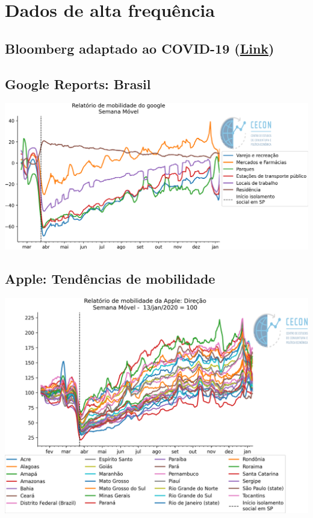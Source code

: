 \documentclass{SelfArx}
\begin{document}
\section*{Dados de alta frequência}
\label{sec:org96d814d}

\subsection*{Bloomberg adaptado ao COVID-19 (\href{https://www.bloomberg.com/news/articles/2020-11-13/alternative-data-show-activity-crashes-as-virus-resurges-chart}{Link})}
\label{sec:org97529b9}

\subsection*{Google Reports: Brasil}
\label{sec:org511cca9}

\begin{center}
\includegraphics[width=.9\linewidth]{./figs/Granulares/GoogleReport_Brasil.png}
\end{center}

\subsection*{Apple: Tendências de mobilidade}
\label{sec:orgc24da32}

\begin{center}
\includegraphics[width=.9\linewidth]{./figs/Granulares/AppleReport_Brasil.png}
\end{center}
\end{document}
